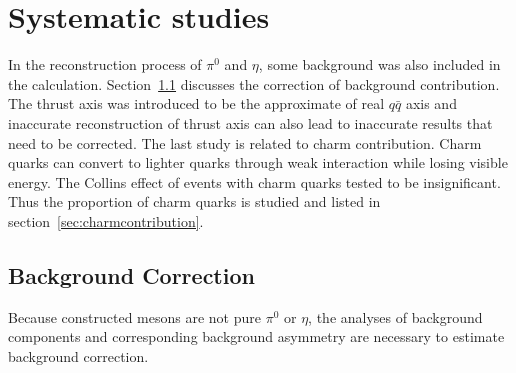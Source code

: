 \section{Systematic studies}
In the reconstruction process of $\pi^0$ and $\eta$, some background was also included in the calculation. Section~\ref{sec:backgroundcorrection} discusses the correction of background contribution. The thrust axis was introduced to be the approximate of real $q\bar{q}$ axis and inaccurate reconstruction of thrust axis can also lead to inaccurate results that need to be corrected. The last study is related to charm contribution. Charm quarks can convert to lighter quarks through weak interaction while losing visible energy. The Collins effect of events with charm quarks tested to be insignificant. Thus the proportion of charm quarks is studied and listed in section~\ref{sec:charmcontribution}.
\subsection{Background Correction}
\label{sec:backgroundcorrection}
Because constructed mesons are not pure $\pi^0$ or $\eta$, the analyses of background components and corresponding background asymmetry are necessary to estimate background correction.

